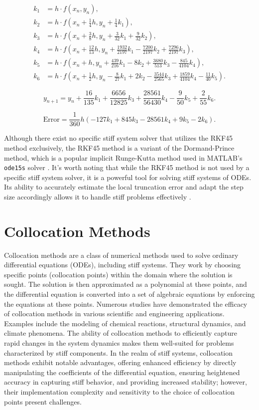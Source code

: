 \documentclass[a4paper, twoside]{report} %
\begin{document}
	\[
	\begin{aligned}
		k_1 & = h \cdot f(x_n, y_n), \\
		k_2 & = h \cdot f\left(x_n + \frac{1}{4}h, y_n + \frac{1}{4}k_1\right), \\
		k_3 & = h \cdot f\left(x_n + \frac{3}{8}h, y_n + \frac{3}{32}k_1 + \frac{9}{32}k_2\right), \\
		k_4 & = h \cdot f\left(x_n + \frac{12}{13}h, y_n + \frac{1932}{2197}k_1 - \frac{7200}{2197}k_2 + \frac{7296}{2197}k_3\right), \\
		k_5 & = h \cdot f\left(x_n + h, y_n + \frac{439}{216}k_1 - 8k_2 + \frac{3680}{513}k_3 - \frac{845}{4104}k_4\right), \\
		k_6 & = h \cdot f\left(x_n + \frac{1}{2}h, y_n - \frac{8}{27}k_1 + 2k_2 - \frac{3544}{2565}k_3 + \frac{1859}{4104}k_4 - \frac{11}{40}k_5\right).
	\end{aligned}
	\]

	\[
	y_{n+1} = y_n + \frac{16}{135}k_1 + \frac{6656}{12825}k_3 + \frac{28561}{56430}k_4 - \frac{9}{50}k_5 + \frac{2}{55}k_6.
	\]

	\[
	\text{Error} = \frac{1}{360}h(-127k_1 + 845k_3 - 28561k_4 + 9k_5 - 2k_6).
	\]

	Although there exist no specific stiff system solver that utilizes the RKF45 method exclusively, the RKF45 method is a variant of the Dormand-Prince method, which is a popular implicit Runge-Kutta method used in MATLAB's \texttt{ode15s} solver \cite{BurkardtRKF45}. It's worth noting that while the RKF45 method is not used by a specific stiff system solver, it is a powerful tool for solving stiff systems of ODEs. Its ability to accurately estimate the local truncation error and adapt the step size accordingly allows it to handle stiff problems effectively \cite{BurkardtRKF45}.



	\section{Collocation Methods}
	Collocation methods are a class of numerical methods used to solve ordinary differential equations (ODEs), including stiff systems. They work by choosing specific points (collocation points) within the domain where the solution is sought. The solution is then approximated as a polynomial at these points, and the differential equation is converted into a set of algebraic equations by enforcing the equations at these points.
	Numerous studies have demonstrated the efficacy of collocation methods in various scientific and engineering applications. Examples include the modeling of chemical reactions, structural dynamics, and climate phenomena. The ability of collocation methods to efficiently capture rapid changes in the system dynamics makes them well-suited for problems characterized by stiff components.
	In the realm of stiff systems, collocation methods exhibit notable advantages, offering enhanced efficiency by directly manipulating the coefficients of the differential equation, ensuring heightened accuracy in capturing stiff behavior, and providing increased stability; however, their implementation complexity and sensitivity to the choice of collocation points present challenges\cite{Faleichik2009ExplicitIO}.
\end{document}
